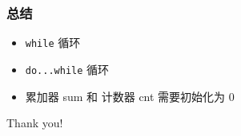 \begin{frame}[fragile]
    \frametitle{总结}

    \begin{itemize}
        \item \lstinline|while| 循环
        \item \lstinline|do...while| 循环
        \item 累加器 sum 和 计数器 cnt 需要初始化为 $0$
    \end{itemize}
\end{frame}

\begin{frame}
    \begin{center}
        {\Huge Thank you!}
    \end{center}
\end{frame}


